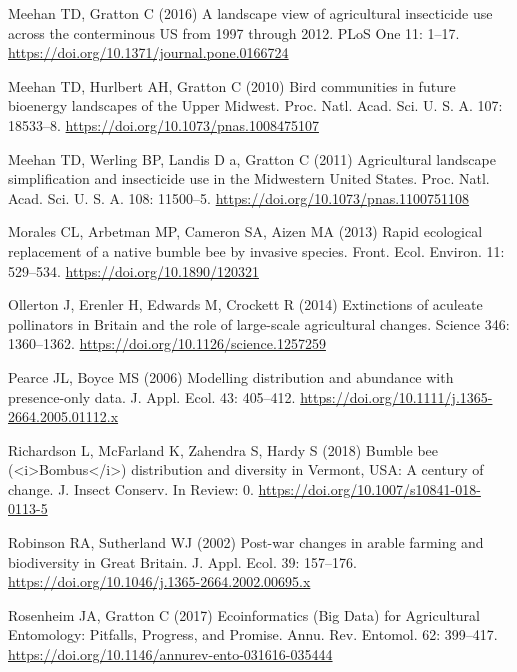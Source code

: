 \documentclass[11pt,]{article}
\begin{document}
\leavevmode\hypertarget{ref-Meehan2016a}{}%
Meehan TD, Gratton C (2016) A landscape view of agricultural insecticide
use across the conterminous US from 1997 through 2012. PLoS One 11:
1--17. \url{https://doi.org/10.1371/journal.pone.0166724}

\leavevmode\hypertarget{ref-Meehan2010a}{}%
Meehan TD, Hurlbert AH, Gratton C (2010) Bird communities in future
bioenergy landscapes of the Upper Midwest. Proc. Natl. Acad. Sci. U. S.
A. 107: 18533--8. \url{https://doi.org/10.1073/pnas.1008475107}

\leavevmode\hypertarget{ref-Meehan2011}{}%
Meehan TD, Werling BP, Landis D a, Gratton C (2011) Agricultural
landscape simplification and insecticide use in the Midwestern United
States. Proc. Natl. Acad. Sci. U. S. A. 108: 11500--5.
\url{https://doi.org/10.1073/pnas.1100751108}

\leavevmode\hypertarget{ref-Morales2013}{}%
Morales CL, Arbetman MP, Cameron SA, Aizen MA (2013) Rapid ecological
replacement of a native bumble bee by invasive species. Front. Ecol.
Environ. 11: 529--534. \url{https://doi.org/10.1890/120321}

\leavevmode\hypertarget{ref-Ollerton.2014}{}%
Ollerton J, Erenler H, Edwards M, Crockett R (2014) Extinctions of
aculeate pollinators in Britain and the role of large-scale agricultural
changes. Science 346: 1360--1362.
\url{https://doi.org/10.1126/science.1257259}

\leavevmode\hypertarget{ref-Pearce2006}{}%
Pearce JL, Boyce MS (2006) Modelling distribution and abundance with
presence-only data. J. Appl. Ecol. 43: 405--412.
\url{https://doi.org/10.1111/j.1365-2664.2005.01112.x}

\leavevmode\hypertarget{ref-Richardson2018}{}%
Richardson L, McFarland K, Zahendra S, Hardy S (2018) Bumble bee
(\textless{}i\textgreater{}Bombus\textless{}/i\textgreater{})
distribution and diversity in Vermont, USA: A century of change. J.
Insect Conserv. In Review: 0.
\url{https://doi.org/10.1007/s10841-018-0113-5}

\leavevmode\hypertarget{ref-Robinson2002}{}%
Robinson RA, Sutherland WJ (2002) Post-war changes in arable farming and
biodiversity in Great Britain. J. Appl. Ecol. 39: 157--176.
\url{https://doi.org/10.1046/j.1365-2664.2002.00695.x}

\leavevmode\hypertarget{ref-Rosenheim2017}{}%
Rosenheim JA, Gratton C (2017) Ecoinformatics (Big Data) for
Agricultural Entomology: Pitfalls, Progress, and Promise. Annu. Rev.
Entomol. 62: 399--417.
\url{https://doi.org/10.1146/annurev-ento-031616-035444}
\end{document}
